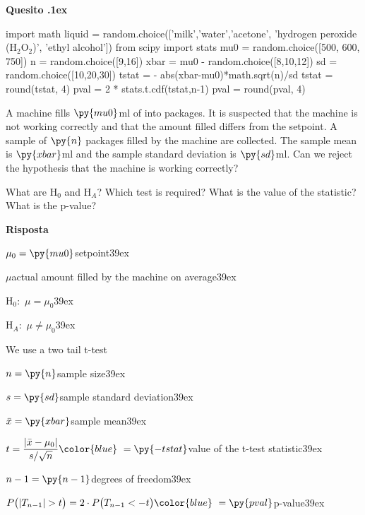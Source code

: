 \documentclass[11pt,twoside,a4paper]{article}
\newcounter{quesito}
\newenvironment{question}{\addtocounter{quesito}{1}\par\textbf{Quesito \thequesito.\kern1ex}}{\vspace{0.5\parskip}}
\newenvironment{answer}{\par\textbf{Risposta\quad}}{\vspace{\parskip}}
\begin{document}
\begin{question}
\begin{pycode}
import math
liquid = random.choice(['milk','water','acetone', 'hydrogen peroxide (H$_2$O$_2$)', 'ethyl alcohol'])
from scipy import stats
mu0 = random.choice([500, 600, 750])
n = random.choice([9,16])
xbar = mu0 - random.choice([8,10,12])
sd = random.choice([10,20,30])
tstat = - abs(xbar-mu0)*math.sqrt(n)/sd
tstat = round(tstat, 4)
pval = 2 * stats.t.cdf(tstat,n-1)
pval = round(pval, 4)
\end{pycode}
A machine fills $\py{mu0}$ml of  into packages. It is suspected that the machine is not working correctly and that the amount filled differs from the setpoint. A sample of $\py{n}$ packages filled by the machine are collected. The sample mean is $\py{xbar}$ml and the sample standard deviation is $\py{sd}$ml. Can we reject the hypothesis that the machine is working correctly?

What are H$_0$ and H$_A$? Which test is required? What is the value of the statistic? What is the p-value?

\begin{answer}\parskip5pt

  $\mu_0 = \py{mu0}$\hfill setpoint\kern39ex
  
  $\mu$\hfill actual amount filled by the machine on average\kern39ex

  H$_0:$ $\mu = \mu_0$\kern39ex
  
  H$_A:$ $\mu\neq\mu_0$\kern39ex
  
  We use a two tail t-test
  
  $n = \py{n}$\hfill sample size\kern39ex
  
  $s = \py{sd}$\hfill sample standard deviation\kern39ex
  
  $\bar{x} = \py{xbar}$\hfill sample mean\kern39ex
  
  $t = \displaystyle\frac{|\bar{x}-\mu_0|}{s/\sqrt{n}}{\color{blue}\ = \py{-tstat}}$\hfill value of the t-test statistic\kern39ex
  
  $n-1 = \py{n-1}$\hfill degrees of freedom\kern39ex
  
  $P\big(|T_{n-1}|>t\big) = 2\cdot P\big(T_{n-1}<-t\big){\color{blue}\  = \py{pval}}$\hfill p-value\kern39ex

\end{answer}
\end{question}
\end{document}
